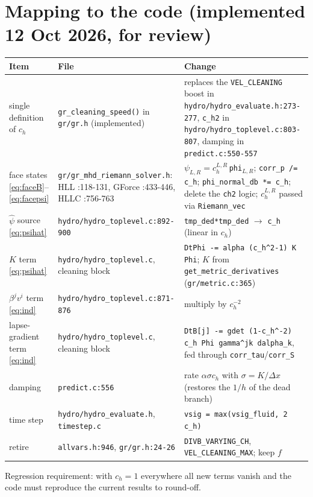 \documentclass[11pt,a4paper]{article}
\newcommand{\ph}{\hat\psi}
\newcommand{\ch}{c_h}
\newcommand{\code}[1]{\texttt{#1}}
\begin{document}
\section{Mapping to the code (implemented 12 Oct 2026, for review)}
\begin{center}
\small
\begin{tabular}{>{\raggedright\arraybackslash}p{2.9cm} >{\raggedright\arraybackslash}p{5.8cm} >{\raggedright\arraybackslash}p{5.5cm}}
\toprule
Item & File & Change\\
\midrule
single definition of $\ch$ & \code{gr\_cleaning\_speed()} in \code{gr/gr.h} (implemented) & replaces the \code{VEL\_CLEANING} boost in \code{hydro/hydro\_evaluate.h:273-277}, \code{c\_h2} in \code{hydro/hydro\_toplevel.c:803-807}, damping in \code{predict.c:550-557}\\
face states \eqref{eq:faceB}--\eqref{eq:facepsi} & \code{gr/gr\_mhd\_riemann\_solver.h}: HLL :118-131, GForce :433-446, HLLC :756-763 & $\psi_{L,R}=\ch^{L,R}\,$\code{phi}$_{L,R}$; \code{corr\_p /= c\_h}; \code{phi\_normal\_db *= c\_h}; delete the \code{ch2} logic; $\ch^{L,R}$ passed via \code{Riemann\_vec}\\
$\ph$ source \eqref{eq:psihat} & \code{hydro/hydro\_toplevel.c:892-900} & \code{tmp\_ded*tmp\_ded} $\to$ \code{c\_h} (linear in $\ch$)\\
$K$ term \eqref{eq:psihat} & \code{hydro/hydro\_toplevel.c}, cleaning block & \code{DtPhi -= alpha (c\_h\^{}2-1) K Phi}; $K$ from \code{get\_metric\_derivatives} (\code{gr/metric.c:365})\\
$\beta^jv^i$ term \eqref{eq:ind} & \code{hydro/hydro\_toplevel.c:871-876} & multiply by $\ch^{-2}$\\
lapse-gradient term \eqref{eq:ind} & \code{hydro/hydro\_toplevel.c}, cleaning block & \code{DtB[j] -= gdet (1-c\_h\^{}-2) c\_h Phi gamma\^{}jk dalpha\_k}, fed through \code{corr\_tau}/\code{corr\_S}\\
damping & \code{predict.c:556} & rate $\alpha\sigma\ch$ with $\sigma=K/\Delta x$ (restores the $1/h$ of the dead branch)\\
time step & \code{hydro/hydro\_evaluate.h}, \code{timestep.c} & \code{vsig = max(vsig\_fluid, 2 c\_h)}\\
retire & \code{allvars.h:946}, \code{gr/gr.h:24-26} & \code{DIVB\_VARYING\_CH}, \code{VEL\_CLEANING\_MAX}; keep $f$\\
\bottomrule
\end{tabular}
\end{center}
Regression requirement: with $\ch=1$ everywhere all new terms vanish and the code must reproduce the current results to round-off.
\end{document}
